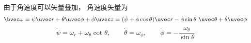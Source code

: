 由于角速度可以矢量叠加， 角速度矢量为
\begin{equation}
\bvec\omega
= \dot\psi\uvec r + \dot\theta\uvec\phi + \dot\phi\uvec z
= (\dot\psi + \dot\phi\cos\theta)\uvec r - \dot\phi\sin\theta\ \uvec\theta +
 \dot\theta\uvec\phi
\end{equation}
\begin{equation}
\dot\psi = \omega_r + \omega_\theta \cot\theta,\qquad
\dot\theta = \omega_\phi,\qquad
\dot\phi = -\frac{\omega_\theta}{\sin\theta}
\end{equation}

